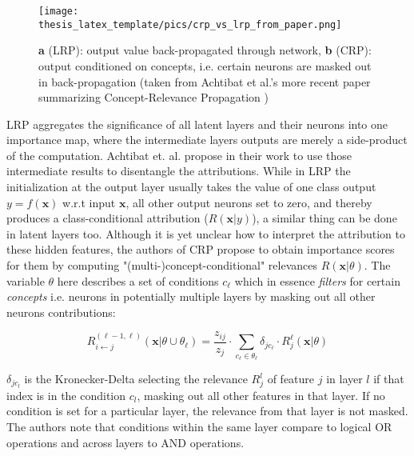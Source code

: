 \begin{figure}[t!]
    \centering
    \texttt{[image: thesis\_latex\_template/pics/crp\_vs\_lrp\_from\_paper.png]}
    \caption[CRP vs. LRP]{\textbf{a} (LRP): output value back-propagated through network, \textbf{b} (CRP): output conditioned on concepts, i.e. certain neurons are masked out in back-propagation (taken from Achtibat et al.'s more recent paper summarizing Concept-Relevance Propagation \cite{Achtibat2023})}
    \label{fig:crp_vs_lrp}
\end{figure}

LRP aggregates the significance of all latent layers and their neurons into one importance map, where the intermediate layers outputs are merely a side-product of the computation.
Achtibat et. al. propose in their work \cite{Achtibat2022} to use those intermediate results to disentangle the attributions. While in LRP the initialization at the output layer usually takes the value of one class output $y= f(\mathbf{x})$ w.r.t input $\mathbf{x}$, all other output neurons set to zero, and thereby produces a class-conditional attribution ($R(\mathbf{x}|y)$), a similar thing can be done in latent layers too. Although it is yet unclear how to interpret the attribution to these hidden features, the authors of CRP propose to obtain importance scores for them by computing "(multi-)concept-conditional" relevances $R(\mathbf{x}|\theta)$. The variable $\theta$ here describes a set of conditions $c_{\ell}$ which in essence \textit{filters} for certain \textit{concepts} i.e. neurons in potentially multiple layers by masking out all other neurons contributions:

\begin{equation}\displaystyle
    R^{(\ell-1, \ell)}_{i \leftarrow j} (\mathbf{x} | \theta \cup \theta_{\ell}) = \frac{z_{ij}}{z_j} \cdot \sum_{c_{\ell} \in \theta_{\ell}} \delta_{jc_{\ell}} \cdot R^{\ell}_j (\mathbf{x} | \theta )
\end{equation}

$\delta_{jc_l}$ is the Kronecker-Delta selecting the relevance $R^l_j$ of feature $j$ in layer $l$ if that index is in the condition $c_l$, masking out all other features in that layer. If no condition is set for a particular layer, the relevance from that layer is not masked. The authors note that conditions within the same layer compare to logical OR operations and across layers to AND operations. 

